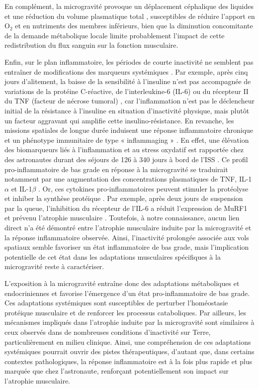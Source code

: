 \documentclass[11pt]{report}
\begin{document}
En complément, la microgravité provoque un déplacement céphalique des liquides et une réduction du volume plasmatique total \parencite{Baran2021Dec}, susceptibles de réduire l'apport en O$_2$ et en nutriments des membres inférieurs, bien que la diminution concomitante de la demande métabolique locale limite probablement l'impact de cette redistribution du flux sanguin sur la fonction musculaire.

Enfin, sur le plan inflammatoire, les périodes de courte inactivité ne semblent pas entraîner de modifications des marqueurs systémiques \parencite{navasiolava_vascular_2020}. Par exemple, après cinq jours d'alitement, la baisse de la sensibilité à l'insuline n'est pas accompagnée de variations de la protéine C-réactive, de l'interleukine-6 (IL-6) ou du récepteur II du TNF (facteur de nécrose tumoral) \parencite{Hamburg2007Dec}, car l'inflammation n'est pas le déclencheur initial de la résistance à l'insuline en situation d'inactivité physique, mais plutôt un facteur aggravant qui amplifie cette insulino-résistance. En revanche, les missions spatiales de longue durée induisent une réponse inflammatoire chronique et un phénotype immunitaire de type « inflammaging » \parencite{navasiolava_vascular_2020,strollo_aging-like_2021}. En effet, une élévation des biomarqueurs liés à l'inflammation et au stress oxydatif est rapportée chez des astronautes durant des séjours de 126 à 340 jours à bord de l'ISS \parencite{Lee2020Jul}. Ce profil pro-inflammatoire de bas grade en réponse à la microgravité se traduirait notamment par une augmentation des concentrations plasmatiques de TNF, IL-1$\alpha$ et IL-1$\beta$ \parencite{marchal_challenges_2024}. Or, ces cytokines pro-inflammatoires peuvent stimuler la protéolyse et inhiber la synthèse protéique \parencite{Sharma2020}. Par exemple, après deux jours de suspension par la queue, l'inhibition du récepteur de l'IL-6 a réduit l'expression de MuRF1 et prévenu l'atrophie musculaire \parencite{Yakabe2018Jan}. Toutefois, à notre connaissance, aucun lien direct n'a été démontré entre l'atrophie musculaire induite par la microgravité et la réponse inflammatoire observée. Ainsi, l'inactivité prolongée associée aux vols spatiaux semble favoriser un état inflammatoire de bas grade, mais l'implication potentielle de cet état dans les adaptations musculaires spécifiques à la microgravité reste à caractériser.

\medskip L'exposition à la microgravité entraîne donc des adaptations métaboliques et endocriniennes et favorise l'émergence d'un état pro-inflammatoire de bas grade. Ces adaptations systémiques sont susceptibles de perturber l'homéostasie protéique musculaire et de renforcer les processus cataboliques. Par ailleurs, les mécanismes impliqués dans l'atrophie induite par la microgravité sont similaires à ceux observés dans de nombreuses conditions d'inactivité sur Terre, particulièrement en milieu clinique. Ainsi, une compréhension de ces adaptations systémiques pourrait ouvrir des pistes thérapeutiques, d'autant que, dans certains contextes pathologiques, la réponse inflammatoire est à la fois plus rapide et plus marquée que chez l'astronaute, renforçant potentiellement son impact sur l'atrophie musculaire.
\end{document}
